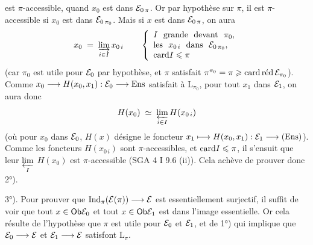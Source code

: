 \dgrchunkbegin

\setcounter{footnote}{174}


est $\pi$-accessible, quand $x_0$ est dans $\cE_{0\,\pi}$. Or par hypothèse sur $\pi$, il est $\pi$-accessible si $x_0$ est dans $\cE_{0\,\pi_0}$. Mais si $x$ est dans $\cE_{0\,\pi}$, on aura %
\[
x_0 \;=\; \varinjlim_{i\in I} x_{0\,i} \qquad
\left\{
\begin{array}{l}
I\ \ \text{grande}\ \ \text{devant}\ \ \pi_0,\\
\text{les}\ \ x_{0\,i}\ \ \text{dans}\ \ \cE_{0\,\pi_0},\\
\card I \leqslant \pi
\end{array}
\right.
\]
(car $\pi_0$ est utile pour $\cE_0$ par hypothèse, et $\pi$ satisfait $\pi^{\pi_0} = \pi \geqslant \cardred \cE_{\pi_0}$). Comme $x_0 \longrightarrow H(x_0,x_1) : \cE_0 \longrightarrow \Ens$ satisfait à $\mathrm{L}_{\pi_0}$, pour tout $x_1$ dans $\cE_1$, on aura donc %
\[
H(x_0) \;\simeq\; \varprojlim_{i\in I} H(x_{0\,i})
\]
(où pour $x_0$ dans $\cE_0$, $H(x)$ désigne le foncteur $x_1 \longmapsto H(x_0,x_1) : \cE_1 \longrightarrow (\Ens)$). Comme %
les foncteurs $H(x_{0\,i})$ sont $\pi$-accessibles, et $\card I \leqslant \pi$, il s'ensuit que leur $\varprojlim\limits_{I}$ $H(x_0)$ est $\pi$-accessible (SGA 4 I 9.6 (ii)). Cela achève de prouver donc 2°).

3°). Pour prouver que $\Ind_\pi(\cE(\pi)) \longrightarrow \cE$ est essentiellement surjectif, il suffit de voir que tout $x \in \Ob\cE_0$ et tout $x \in \Ob\cE_1$
est dans l'image essentielle. Or cela résulte de l'hypothèse que $\pi$ est utile pour $\cE_0$ et $\cE_1$, et de 1°) qui implique que $\cE_0 \longrightarrow \cE$ et $\cE_1 \longrightarrow \cE$ satisfont $\mathrm{L}_\pi$.

